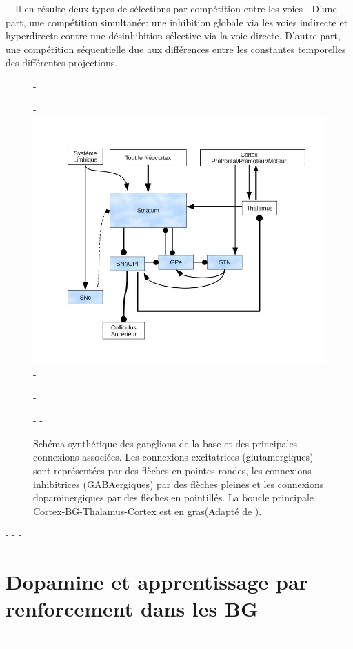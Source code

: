 -
-Il en résulte deux types de sélections par compétition entre les voies \citep{Hikosaka:1993}. D'une part, une compétition simultanée: une inhibition globale via les voies indirecte et hyperdirecte contre une désinhibition sélective via la voie directe. D'autre part, une compétition séquentielle due aux différences entre les constantes temporelles des différentes projections.
-
-\begin{figure}
-\begin{center}
-\includegraphics[width=\textwidth]{Pics/BG2}
-\end{center}
-\caption{Schéma synthétique des ganglions de la base et des principales connexions associées. Les connexions excitatrices (glutamergiques) sont représentées par des flèches en pointes rondes, les connexions inhibitrices (GABAergiques) par des flèches pleines et les connexions dopaminergiques par des flèches en pointillés. La boucle principale Cortex-BG-Thalamus-Cortex est en gras(Adapté de \citep{Graybiel:1993}).}
-\label{BG2}
-\end{figure}
-
-
-\section {Dopamine et apprentissage par renforcement dans les BG}
-
-%
